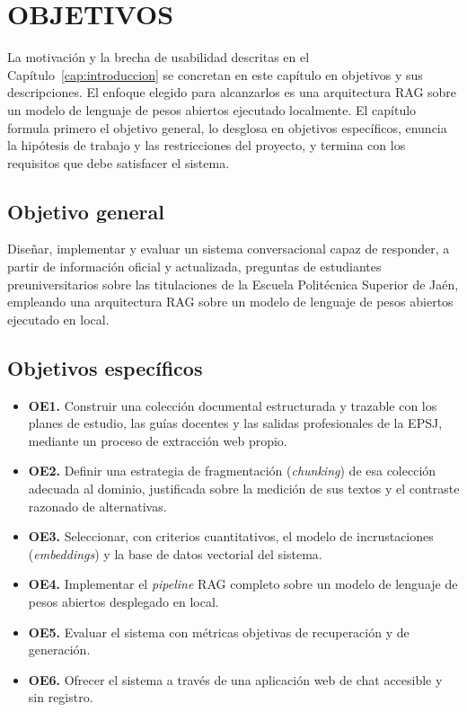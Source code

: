 \chapter{OBJETIVOS}
\label{cap:objetivos}

La motivación y la brecha de usabilidad descritas en el Capítulo~\ref{cap:introduccion} se concretan en este capítulo en objetivos y sus descripciones. El enfoque elegido para alcanzarlos es una arquitectura RAG sobre un modelo de lenguaje de pesos abiertos ejecutado localmente. El capítulo formula primero el objetivo general, lo desglosa en objetivos específicos, enuncia la hipótesis de trabajo y las restricciones del proyecto, y termina con los requisitos que debe satisfacer el sistema.

\section{Objetivo general}

Diseñar, implementar y evaluar un sistema conversacional capaz de responder, a
partir de información oficial y actualizada, preguntas de estudiantes
preuniversitarios sobre las titulaciones de la Escuela Politécnica Superior de
Jaén, empleando una arquitectura RAG
sobre un modelo de lenguaje de pesos abiertos ejecutado en local.

\section{Objetivos específicos}

\begin{itemize}                                                                                                                
  \item \textbf{OE1.} Construir una colección documental estructurada y
        trazable con los planes de estudio, las guías docentes y las salidas
        profesionales de la EPSJ, mediante un proceso de extracción web propio.
  \item \textbf{OE2.} Definir una estrategia de
        fragmentación (\textit{chunking}) de esa colección adecuada al dominio,
        justificada sobre la medición de sus textos y el contraste razonado de
        alternativas.
  \item \textbf{OE3.} Seleccionar, con criterios cuantitativos, el modelo de
        incrustaciones (\textit{embeddings}) y la base de datos vectorial del
        sistema.
  \item \textbf{OE4.} Implementar el \textit{pipeline} RAG completo sobre un
        modelo de lenguaje de pesos abiertos
        desplegado en local.
  \item \textbf{OE5.} Evaluar el sistema con métricas objetivas de
        recuperación y de generación.
  \item \textbf{OE6.} Ofrecer el sistema a través de una aplicación web de
        chat accesible y sin registro.
\end{itemize}



